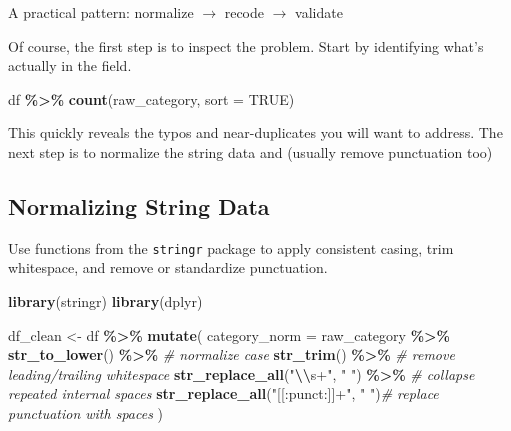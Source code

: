 \documentclass[
  11pt,
]{article}
\newenvironment{Shaded}{\begin{snugshade}}{\end{snugshade}}
\newcommand{\AttributeTok}[1]{\textcolor[rgb]{0.13,0.29,0.53}{#1}}
\newcommand{\CommentTok}[1]{\textcolor[rgb]{0.56,0.35,0.01}{\textit{#1}}}
\newcommand{\ConstantTok}[1]{\textcolor[rgb]{0.56,0.35,0.01}{#1}}
\newcommand{\FunctionTok}[1]{\textcolor[rgb]{0.13,0.29,0.53}{\textbf{#1}}}
\newcommand{\NormalTok}[1]{#1}
\newcommand{\OtherTok}[1]{\textcolor[rgb]{0.56,0.35,0.01}{#1}}
\newcommand{\SpecialCharTok}[1]{\textcolor[rgb]{0.81,0.36,0.00}{\textbf{#1}}}
\newcommand{\StringTok}[1]{\textcolor[rgb]{0.31,0.60,0.02}{#1}}
\begin{document}
A practical pattern: normalize \(\rightarrow\) recode \(\rightarrow\)
validate

Of course, the first step is to inspect the problem. Start by
identifying what's actually in the field.

\begin{Shaded}
\begin{Highlighting}[]
\NormalTok{df }\SpecialCharTok{\%\textgreater{}\%}
  \FunctionTok{count}\NormalTok{(raw\_category, }\AttributeTok{sort =} \ConstantTok{TRUE}\NormalTok{)}
\end{Highlighting}
\end{Shaded}

This quickly reveals the typos and near-duplicates you will want to
address. The next step is to normalize the string data and (usually
remove punctuation too)

\subsection{Normalizing String Data}\label{normalizing-string-data}

Use functions from the \texttt{stringr} package to apply consistent
casing, trim whitespace, and remove or standardize punctuation.

\begin{Shaded}
\begin{Highlighting}[]
\FunctionTok{library}\NormalTok{(stringr)}
\FunctionTok{library}\NormalTok{(dplyr)}

\NormalTok{df\_clean }\OtherTok{\textless{}{-}}\NormalTok{ df }\SpecialCharTok{\%\textgreater{}\%}
  \FunctionTok{mutate}\NormalTok{(}
    \AttributeTok{category\_norm =}\NormalTok{ raw\_category }\SpecialCharTok{\%\textgreater{}\%}
      \FunctionTok{str\_to\_lower}\NormalTok{() }\SpecialCharTok{\%\textgreater{}\%}                  \CommentTok{\# normalize case}
      \FunctionTok{str\_trim}\NormalTok{() }\SpecialCharTok{\%\textgreater{}\%}                      \CommentTok{\# remove leading/trailing whitespace}
      \FunctionTok{str\_replace\_all}\NormalTok{(}\StringTok{"}\SpecialCharTok{\textbackslash{}\textbackslash{}}\StringTok{s+"}\NormalTok{, }\StringTok{" "}\NormalTok{) }\SpecialCharTok{\%\textgreater{}\%}    \CommentTok{\# collapse repeated internal spaces}
      \FunctionTok{str\_replace\_all}\NormalTok{(}\StringTok{"[[:punct:]]+"}\NormalTok{, }\StringTok{" "}\NormalTok{)}\CommentTok{\# replace punctuation with spaces}
\NormalTok{  )}
\end{Highlighting}
\end{Shaded}
\end{document}
